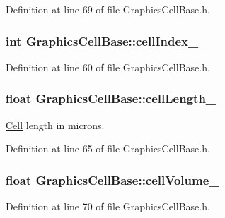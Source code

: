 \-Definition at line 69 of file \-Graphics\-Cell\-Base.\-h.

\hypertarget{class_graphics_cell_base_abc8e8449329725e09994f29303133f1b}{
\subsubsection[{cell\-Index\-\_\-}]{\setlength{\rightskip}{0pt plus 5cm}int {\bf \-Graphics\-Cell\-Base\-::cell\-Index\-\_\-}}}\label{class_graphics_cell_base_abc8e8449329725e09994f29303133f1b}


\-Definition at line 60 of file \-Graphics\-Cell\-Base.\-h.

\hypertarget{class_graphics_cell_base_af802ab0cfb04f2ff82d1ae98e7c572ec}{
\subsubsection[{cell\-Length\-\_\-}]{\setlength{\rightskip}{0pt plus 5cm}float {\bf \-Graphics\-Cell\-Base\-::cell\-Length\-\_\-}}}\label{class_graphics_cell_base_af802ab0cfb04f2ff82d1ae98e7c572ec}
\hyperlink{class_cell}{\-Cell} length in microns. 

\-Definition at line 65 of file \-Graphics\-Cell\-Base.\-h.

\hypertarget{class_graphics_cell_base_a05f33e20efcbaf7be07c1267987c5dda}{
\subsubsection[{cell\-Volume\-\_\-}]{\setlength{\rightskip}{0pt plus 5cm}float {\bf \-Graphics\-Cell\-Base\-::cell\-Volume\-\_\-}}}\label{class_graphics_cell_base_a05f33e20efcbaf7be07c1267987c5dda}


\-Definition at line 70 of file \-Graphics\-Cell\-Base.\-h.

